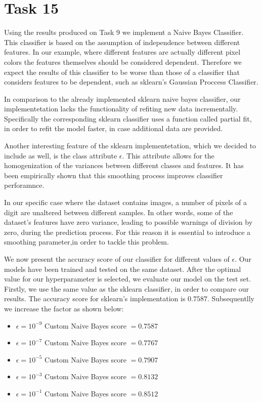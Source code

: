 \documentclass{article}
\begin{document}
    
    \section{Task 15}
    Using the results produced on Task 9 we implement a Naive Bayes Classifier.
    This classifier is based on the assumption of independence between different features.
    In our example, where different features are actually different pixel colors the features themselves should be considered dependent.
    Therefore we expect the results of this classifier to be worse than those of a classifier that considers features to be dependent, such as sklearn's Gaussian Proccess Classifier.

    In comparison to the already implemented sklearn naive bayes classifier, our implementetation lacks the functionality of refiting new data incrementally.
    Specifically the corresponding sklearn classifier uses a function called partial fit, in order to refit the model faster, in case additional data are provided.
    
    Another interesting feature of the sklearn implementetation, which we decided to include as well, is the class attribute $\epsilon$.
    This attribute allows for the homogenization of the variances between different classes and features.
    It has been empirically shown that this smoothing process improves classifier perforamnce.
    
    In our specific case where the dataset contains images, a number of pixels of a digit are unaltered between different samples.
    In other words, some of the dataset's features have zero variance, leading to possible warnings of division by zero, during the prediction process.
    For this reason it is essential to introduce a smoothing parameter,in order to tackle this problem.

    We now present the accuracy score of our classifier for different values of $\epsilon$.
    Our models have been trained and tested on the same dataset. \newline
    After the optimal value for our hyperparameter is selected, we evaluate our model on the test set.
    Firstly, we use the same value as the sklearn classifier, in order to compare our results.
    The accuracy score for sklearn's implementation is $0.7587$.
    Subsequentlly we increase the factor as shown below:
    \begin{itemize}
        \item $\epsilon = 10 ^ {-9}$ Custom Naive Bayes score $= 0.7587$
        \item $\epsilon = 10 ^ {-7}$ Custom Naive Bayes score $= 0.7767$
        \item $\epsilon = 10 ^{-5}$ Custom Naive Bayes score $= 0.7907$
        \item $\epsilon = 10 ^ {-3}$ Custom Naive Bayes score $= 0.8132$
        \item $\epsilon = 10^{-1}$ Custom Naive Bayes score $= 0.8512$
    \end{itemize}
\end{document}
